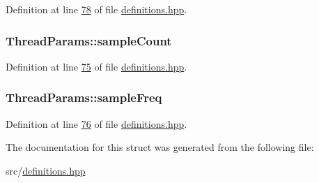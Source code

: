 Definition at line \hyperlink{definitions_8hpp_source_l00078}{78} of file \hyperlink{definitions_8hpp_source}{definitions.\+hpp}.

\hypertarget{structThreadParams_ad953eac404cb1fe5057bb6e8fd8bf63f}{
\subsubsection[{sample\+Count}]{ Thread\+Params\+::sample\+Count}}\label{structThreadParams_ad953eac404cb1fe5057bb6e8fd8bf63f}


Definition at line \hyperlink{definitions_8hpp_source_l00075}{75} of file \hyperlink{definitions_8hpp_source}{definitions.\+hpp}.

\hypertarget{structThreadParams_a4c35a854b35945bda8ce13c01123e420}{
\subsubsection[{sample\+Freq}]{ Thread\+Params\+::sample\+Freq}}\label{structThreadParams_a4c35a854b35945bda8ce13c01123e420}


Definition at line \hyperlink{definitions_8hpp_source_l00076}{76} of file \hyperlink{definitions_8hpp_source}{definitions.\+hpp}.



The documentation for this struct was generated from the following file\+:\begin{DoxyCompactItemize}
\item 
src/\hyperlink{definitions_8hpp}{definitions.\+hpp}\end{DoxyCompactItemize}
